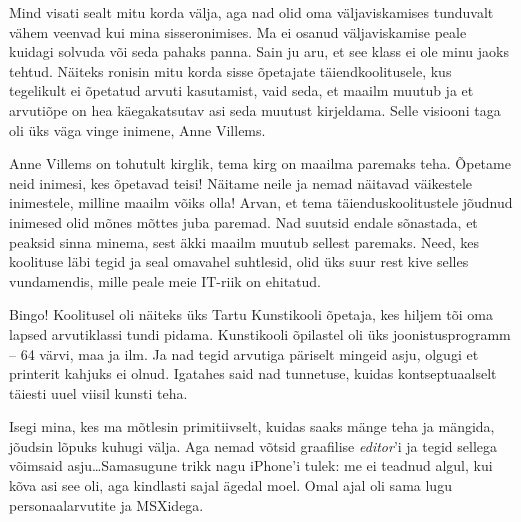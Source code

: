 
Mind visati sealt mitu korda välja, aga nad olid oma väljaviskamises 
tunduvalt vähem veenvad kui mina sisseronimises. Ma ei osanud väljaviskamise peale
kuidagi solvuda või seda pahaks panna. 
Sain ju aru, et see klass ei ole minu jaoks tehtud. Näiteks ronisin 
mitu korda sisse õpetajate täiendkoolitusele, kus tegelikult ei õpetatud 
arvuti kasutamist, vaid seda, et maailm muutub ja et arvutiõpe on 
hea käegakatsutav asi seda muutust kirjeldama. Selle visiooni taga oli üks 
väga vinge inimene, Anne Villems.

Anne Villems on tohutult kirglik, tema kirg on maailma 
paremaks teha. Õpetame neid inimesi, kes õpetavad teisi! Näitame neile ja nemad
näitavad väikestele inimestele, milline maailm võiks olla! 
Arvan, et tema täienduskoolitustele jõudnud inimesed 
olid mõnes mõttes juba paremad. Nad suutsid endale 
sõnastada, et peaksid sinna minema, sest äkki maailm muutub sellest paremaks. Need, 
kes koolituse läbi tegid ja seal omavahel suhtlesid, 
olid üks suur rest kive selles vundamendis, mille peale meie IT-riik on 
ehitatud.


Bingo! Koolitusel oli näiteks
üks Tartu Kunstikooli õpetaja, kes hiljem tõi oma lapsed 
arvutiklassi tundi pidama. Kunstikooli õpilastel oli üks
joonistusprogramm -- 64 värvi, maa ja ilm. Ja nad tegid arvutiga päriselt mingeid asju, olgugi et printerit kahjuks ei olnud. 
Igatahes said nad tunnetuse, kuidas kontseptuaalselt täiesti uuel viisil kunsti teha. 

Isegi mina, kes ma mõtlesin primitiivselt, kuidas saaks mänge teha ja 
mängida, jõudsin lõpuks kuhugi välja. Aga nemad võtsid 
graafilise \emph{editor}'i ja tegid sellega võimsaid
asju\ldots Samasugune trikk nagu iPhone'i tulek: me ei teadnud algul, kui kõva asi see oli, aga kindlasti 
sajal ägedal moel. Omal ajal oli sama lugu personaalarvutite ja MSXidega.


